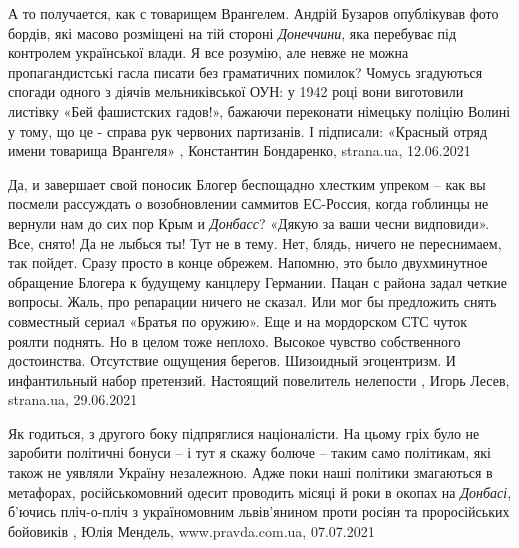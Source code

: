 А то получается, как с товарищем Врангелем.  Андрій Бузаров опублікував фото
бордів, які масово розміщені на тій стороні \emph{Донеччини}, яка перебуває під
контролем української влади. Я все розумію, але невже не можна пропагандистські
гасла писати без граматичних помилок?  Чомусь згадуються спогади одного з
діячів мельниківської ОУН: у 1942 році вони виготовили листівку «Бей фашистских
гадов!», бажаючи переконати німецьку поліцію Волині у тому, що це - справа рук
червоних партизанів. І підписали: «Красный отряд имени товарища Врангеля»
, 
Константин Бондаренко, strana.ua, 12.06.2021


Да, и завершает свой поносик Блогер беспощадно хлестким упреком – как вы
посмели рассуждать о возобновлении саммитов ЕС-Россия, когда гоблинцы не
вернули нам до сих пор Крым и \emph{Донбасс}? «Дякую за ваши чесни видповиди». Все,
снято! Да не лыбься ты! Тут не в тему. Нет, блядь, ничего не переснимаем, так
пойдет. Сразу просто в конце обрежем.  Напомню, это было двухминутное обращение
Блогера к будущему канцлеру Германии. Пацан с района задал четкие вопросы.
Жаль, про репарации ничего не сказал. Или мог бы предложить снять совместный
сериал «Братья по оружию». Еще и на мордорском СТС чуток роялти поднять. Но в
целом тоже неплохо. Высокое чувство собственного достоинства. Отсутствие
ощущения берегов. Шизоидный эгоцентризм. И инфантильный набор претензий.
Настоящий повелитель нелепости
, 
Игорь Лесев, strana.ua, 29.06.2021

Як годиться, з другого боку підпряглися націоналісти. На цьому гріх було не
заробити політичні бонуси – і тут я скажу болюче – таким само політикам, які
також не уявляли Україну незалежною. 
Адже поки наші політики змагаються в метафорах, російськомовний одесит
проводить місяці й роки в окопах на \emph{Донбасі}, б’ючись пліч-о-пліч з
україномовним львів’янином проти росіян та проросійських бойовиків
, 
Юлія Мендель, www.pravda.com.ua, 07.07.2021

